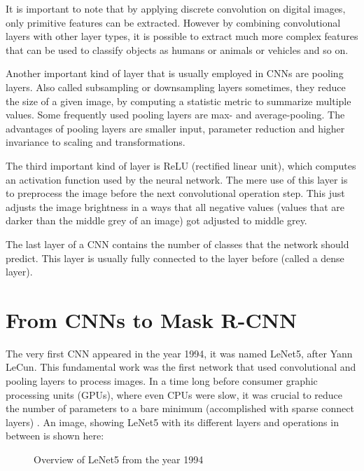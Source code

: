 It is important to note that by applying discrete convolution on digital images, only primitive features can be extracted. However by combining convolutional layers with other layer types, it is possible to extract much more complex features that can be used to classify objects as humans or animals or vehicles and so on.

Another important kind of layer that is usually employed in CNNs are pooling layers. Also called subsampling or downsampling layers sometimes, they reduce the size of a given image, by computing a statistic metric to summarize multiple values. Some frequently used pooling layers are max- and average-pooling. The advantages of pooling layers are smaller input, parameter reduction and higher invariance to scaling and transformations. \cite{DL}

The third important kind of layer is ReLU (rectified linear unit), which computes an activation function used by the neural network. The mere use of this layer is to preprocess the image before the next convolutional operation step. This just adjusts the image brightness in a ways that all negative values (values that are darker than the middle grey of an image) got adjusted to middle grey. \cite{DL}

The last layer of a CNN contains the number of classes that the network should predict. This layer is usually fully connected to the layer before (called a dense layer).

\section{From CNNs to Mask R-CNN}

The very first CNN appeared in the year 1994, it was named LeNet5, after Yann LeCun. This fundamental work was the first network that used convolutional and pooling layers to process images. In a time long before consumer graphic processing units (GPUs), where even CPUs were slow, it was crucial to reduce the number of parameters to a bare minimum (accomplished with sparse connect layers) \cite{LeNet5}. An image, showing LeNet5 with its different layers and operations in between is shown here:

\begin{figure}[H]
	\caption{\label{fig:lenet5} Overview of LeNet5 from the year 1994}
\end{figure}

